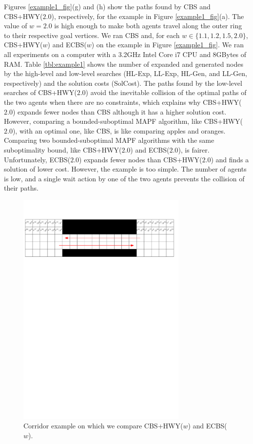 \documentclass[letterpaper]{article}
\theoremstyle{definition}
\begin{document}
Figures \ref{example1_fig}(g) and (h) show the paths found by CBS and
CBS+HWY($2.0$), respectively, for the example in Figure \ref{example1_fig}(a).
The value of $w = 2.0$ is high enough to make both agents travel along the
outer ring to their respective goal vertices. We ran CBS and, for each $w \in
\{ 1.1, 1.2, 1.5, 2.0 \}$, CBS+HWY($w$) and ECBS($w$) on the example in Figure
\ref{example1_fig}. We ran all experiments on a computer with a 3.2GHz Intel
Core i7 CPU and 8GBytes of RAM. Table \ref{tbl:example1} shows the number of
expanded and generated nodes by the high-level and low-level searches (HL-Exp,
LL-Exp, HL-Gen, and LL-Gen, respectively) and the solution costs
(SolCost). The paths found by the low-level searches of CBS+HWY($2.0$) avoid
the inevitable collision of the optimal paths of the two agents when there are
no constraints, which explains why CBS+HWY($2.0$) expands fewer nodes than CBS
although it has a higher solution cost. However, comparing a
bounded-suboptimal MAPF algorithm, like CBS+HWY($2.0$), with an optimal one,
like CBS, is like comparing apples and oranges. Comparing two
bounded-suboptimal MAPF algorithms with the same suboptimality bound, like
CBS+HWY($2.0$) and ECBS($2.0$), is fairer.  Unfortunately, ECBS($2.0$) expands
fewer nodes than CBS+HWY($2.0$) and finds a solution of lower cost. However,
the example is too simple. The number of agents is low, and a single wait
action by one of the two agents prevents the collision of their paths.

\begin{figure}[t]
  \centering
	\includegraphics[width=0.75\textwidth]{Figs/example2.pdf}
  \caption{Corridor example on which we compare CBS+HWY($w$) and ECBS($w$).}
  \label{example2_fig}
\end{figure}
\end{document}
